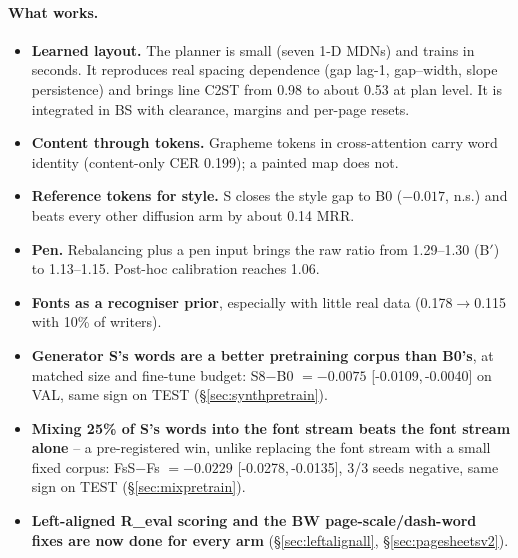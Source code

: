 \documentclass[10.5pt,a4paper]{article}
\newcommand{\Bp}{B$'$}
\newcommand{\ci}[2]{{\footnotesize[#1,\,#2]}}
\begin{document}
\paragraph{What works.}
\begin{itemize}
\item \textbf{Learned layout.} The planner is small (seven 1-D MDNs) and trains in seconds. It reproduces real spacing
  dependence (gap lag-1, gap--width, slope persistence) and brings line C2ST from 0.98 to about 0.53 at plan level. It is
  integrated in BS with clearance, margins and per-page resets.
\item \textbf{Content through tokens.} Grapheme tokens in cross-attention carry word identity (content-only CER 0.199); a
  painted map does not.
\item \textbf{Reference tokens for style.} S closes the style gap to B0 ($-0.017$, n.s.) and beats every other diffusion arm
  by about 0.14 MRR.
\item \textbf{Pen.} Rebalancing plus a pen input brings the raw ratio from 1.29--1.30 (\Bp) to 1.13--1.15. Post-hoc
  calibration reaches 1.06.
\item \textbf{Fonts as a recogniser prior}, especially with little real data (0.178$\to$0.115 with 10\% of writers).
\item \textbf{Generator S's words are a better pretraining corpus than B0's}, at matched size and fine-tune budget:
  S8$-$B0 $=-0.0075$ \ci{-0.0109}{-0.0040} on VAL, same sign on TEST (\S\ref{sec:synthpretrain}).
\item \textbf{Mixing 25\% of S's words into the font stream beats the font stream alone} -- a pre-registered win, unlike
  replacing the font stream with a small fixed corpus: FsS$-$Fs $=-0.0229$ \ci{-0.0278}{-0.0135}, 3/3 seeds negative, same
  sign on TEST (\S\ref{sec:mixpretrain}).
\item \textbf{Left-aligned R\_eval scoring and the BW page-scale/dash-word fixes are now done for every arm}
  (\S\ref{sec:leftalignall}, \S\ref{sec:pagesheetsv2}).
\end{itemize}
\end{document}
